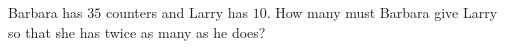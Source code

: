 Barbara has $ 35 $ counters and Larry has $ 10 $. How many must Barbara give Larry so that she has twice as many as he does?
